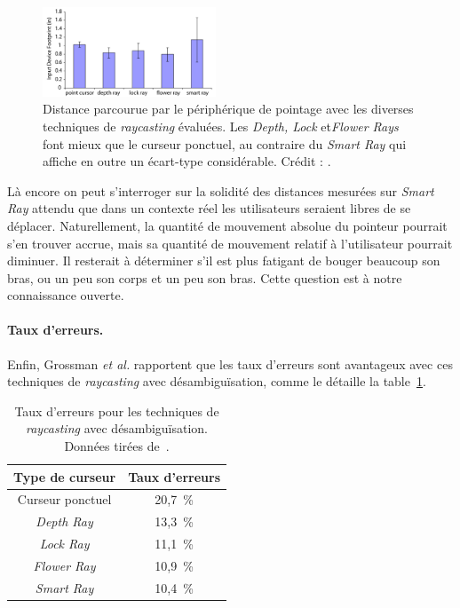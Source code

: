 	\begin{figure} %
		\centering
		\includegraphics[width=0.46\textwidth]{figures/ch2/rayFootprint}
		\caption[\emph{Raycasting} et désambiguïsation -- distance parcourue par le périphérique]{Distance parcourue par le périphérique de pointage avec les diverses techniques de \emph{raycasting} évaluées. Les \emph{Depth, Lock} et\emph{Flower Rays} font mieux que le curseur ponctuel, au contraire du \emph{Smart Ray} qui affiche en outre un écart-type considérable. Crédit : \cite{grossman2006design}.}
		\label{fig:rayFootprint}
	\end{figure}
	
	Là encore on peut s'interroger sur la solidité des distances mesurées sur \emph{Smart Ray} attendu que dans un contexte \og réel \fg{} les utilisateurs seraient libres de se déplacer. Naturellement, la quantité de mouvement absolue du pointeur pourrait s'en trouver accrue, mais sa quantité de mouvement relatif à l'utilisateur pourrait diminuer. Il resterait à déterminer s'il est plus fatigant de bouger beaucoup son bras, ou un peu son corps et un peu son bras. Cette question est à notre connaissance ouverte.
	
	\paragraph{Taux d'erreurs.}
	Enfin, Grossman \emph{et al.} rapportent que les taux d'erreurs sont avantageux avec ces techniques de \emph{raycasting} avec désambiguïsation, comme le détaille la table~\ref{tab:rayErrors}.
	
	\begin{table}
	\centering
	\begin{tabular}{c c}
		Type de curseur			& Taux d'erreurs \bigstrut[b] \\ \hline
		Curseur ponctuel		& 20,7~\%{} \bigstrut[t] \\
		\emph{Depth Ray}		& 13,3~\%{} \\
		\emph{Lock Ray}			& 11,1~\%{} \\
		\emph{Flower Ray}		& 10,9~\%{} \\
		\emph{Smart Ray}		& 10,4~\%{} \\
	\end{tabular}
	\caption[Taux d'erreurs pour les techniques de \emph{raycasting} avec désambiguïsation]{Taux d'erreurs pour les techniques de \emph{raycasting} avec désambiguïsation. Données tirées de~\cite{grossman2006design}.}
	\label{tab:rayErrors}
	\end{table}
	
